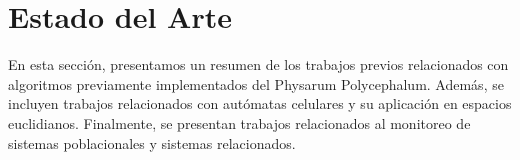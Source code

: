 \section{Estado del Arte}
\label{section:estadoarte}
    En esta secci\'on, presentamos un resumen de los trabajos previos relacionados con algoritmos previamente 
        implementados del Physarum Polycephalum. Adem\'as, se incluyen trabajos relacionados con aut\'omatas celulares
        y su aplicaci\'on en espacios euclidianos. Finalmente, se presentan trabajos relacionados al monitoreo de 
        sistemas poblacionales y sistemas relacionados.
    \vskip 0.5cm
    